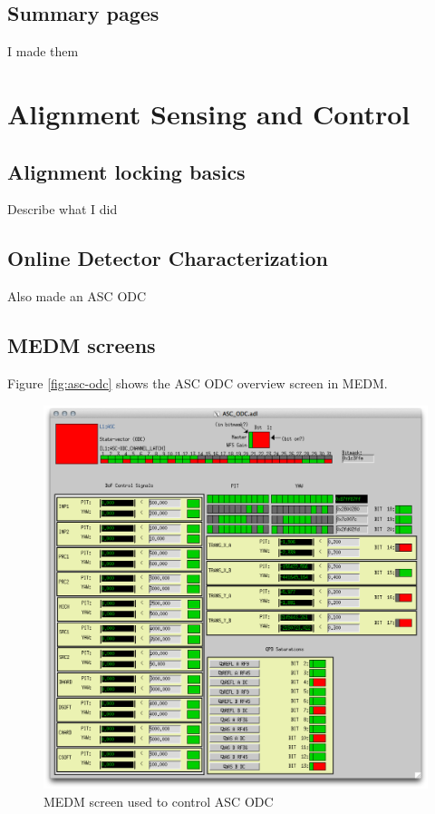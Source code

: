 \subsection{Summary pages}
I made them

\section{Alignment Sensing and Control}

\subsection{Alignment locking basics}

Describe what I did

\subsection{Online Detector Characterization}

Also made an ASC ODC

\subsection{MEDM screens}

Figure \ref{fig:asc-odc} shows the ASC ODC overview screen in MEDM.

\begin{figure}[ht!]
\includegraphics[width=\textwidth]{figures/ODC/ASC_screen}
\caption[ASC ODC Overview Screen]{MEDM screen used to control ASC ODC}
\end{figure}\label{fig:asc-odc}

